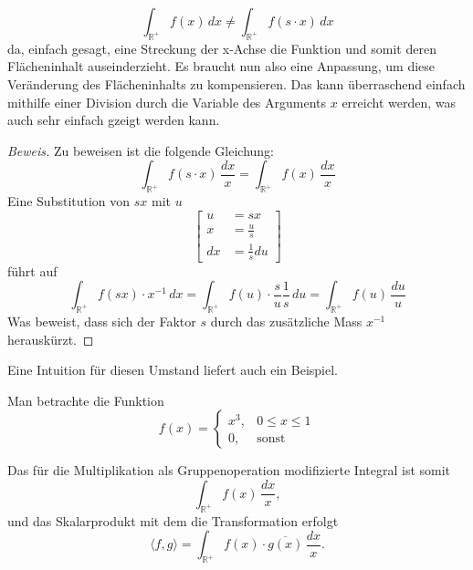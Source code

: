 \begin{equation}
    \int_\mathbb{R^+} f(x)\,dx \neq \int_\mathbb{R^+} f(s \cdot x)\,dx
\end{equation}
da, einfach gesagt, eine Streckung der x-Achse die Funktion und somit deren Flächeninhalt auseinderzieht.
Es braucht nun also eine Anpassung, um diese Veränderung des Flächeninhalts zu kompensieren.
Das kann überraschend einfach mithilfe einer Division durch die Variable des Arguments $x$ erreicht werden, was auch sehr einfach gzeigt 
werden kann.
\begin{proof}[Beweis]
    Zu beweisen ist die folgende Gleichung:
    \[
        \int_\mathbb{R^+} f(s \cdot x)\,\frac{dx}{x} = \int_\mathbb{R^+} f(x)\,\frac{dx}{x}
    \]
    Eine Substitution von $sx$ mit $u$
    \[
    \left[
    \begin{aligned}
        u &= sx \\
        x &= \frac{u}{s} \\
        dx &= \frac{1}{s} du
    \end{aligned}
    \right]
    \]
    führt auf
    \[
        \int_\mathbb{R^+} f(sx) \cdot x^{-1}\,dx = \int_\mathbb{R^+} f(u) \cdot \frac{s}{u} \frac{1}{s}\,du 
        = \int_\mathbb{R^+} f(u)\,\frac{du}{u}
    \]
    Was beweist, dass sich der Faktor $s$ durch das zusätzliche Mass $x^{-1}$ herauskürzt. 
\end{proof}
Eine Intuition für diesen Umstand liefert auch ein Beispiel.
\begin{beispiel}
Man betrachte die Funktion 
\[
f(x) = \begin{cases}
    x^3, & 0\leq x\leq 1\\
    0, & \text{sonst}
\end{cases}
\]
\end{beispiel}
Das für die Multiplikation als Gruppenoperation modifizierte Integral ist somit
\begin{equation}
    \int_\mathbb{R^+} f(x)\,\frac{dx}{x},
\end{equation}
und das Skalarprodukt mit dem die Transformation erfolgt
\begin{equation}
    \langle f,g \rangle = \int_\mathbb{R^+} f(x) \cdot \overline{g(x)} \,\frac{dx}{x}.
\end{equation}





